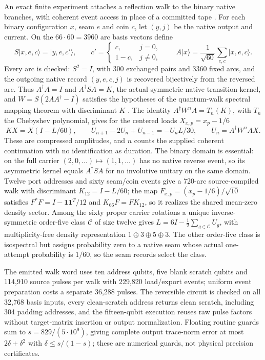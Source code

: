 \documentclass[11pt]{article}
\theoremstyle{definition}
\theoremstyle{remark}
\theoremstyle{plain}
\newcommand{\ket}[1]{\lvert #1\rangle}
\begin{document}
An exact finite experiment attaches a reflection walk to the binary native
branches, with coherent event access in place of a committed tape
\cite{oCOHERENT}. For each binary configuration $x$, seam $e$ and coin $c$,
let $(y,j)$ be the native output and current. On the $66\cdot60=3960$ arc
basis vectors define
\[
 S\ket{x,e,c}=\ket{y,e,c'},\qquad
 c'=\begin{cases}c,&j=0,\\1-c,&j\ne0,\end{cases}
 \qquad A\ket{x}=\frac1{\sqrt{60}}\sum_{e,c}\ket{x,e,c}.
\]
Every arc is checked: $S^2=I$, with 300 exchanged pairs and 3360 fixed arcs,
and the outgoing native record $(y,e,c,j)$ is recovered bijectively from the
reversed arc. Thus $A^\dagger A=I$ and $A^\dagger SA=K$, the actual symmetric
native transition kernel, and $W=S(2AA^\dagger-I)$ satisfies the hypotheses
of the quantum-walk spectral mapping theorem with discriminant $K$
\cite{pwhiguchi2016spectral,pwszegedy2004spectra}. The identity
$A^\dagger W^nA=T_n(K)$, with $T_n$ the Chebyshev polynomial, gives for the
centered loads $X_{x,p}=x_p-1/6$
\[
 KX=X(I-L/60),\qquad
 U_{n+1}-2U_n+U_{n-1}=-U_nL/30,
 \qquad U_n=A^\dagger W^nAX.
\]
These are compressed amplitudes, and $n$ counts the supplied coherent
continuation with no identification as duration. The binary domain is
essential: on the full carrier $(2,0,\ldots)\mapsto(1,1,\ldots)$ has no native
reverse event, so its asymmetric kernel equals $A^\dagger SA$ for no
involutive unitary on the same domain. Twelve port addresses and sixty
seam/coin events give a 720-arc source-compiled walk with discriminant
$K_{12}=I-L/60$; the map $F_{x,p}=(x_p-1/6)/\sqrt{10}$ satisfies
$F^*F=I-\mathbf1\mathbf1^T/12$ and $K_{66}F=FK_{12}$, so it realizes the
shared mean-zero density sector. Among the sixty proper carrier rotations a
unique inverse-symmetric order-five class $\mathcal C$ of size twelve gives
$L=6I-\frac12\sum_{g\in\mathcal C}U_g$, with multiplicity-free density
representation $1\oplus3\oplus5\oplus3$. The other order-five class is
isospectral but assigns probability zero to a native seam whose actual
one-attempt probability is $1/60$, so the seam records select the class.

The emitted walk word uses ten address qubits, five blank scratch qubits and
114,910 source pulses per walk with 229,820 load/export events; uniform event
preparation costs a separate 36,288 pulses. The reversible circuit is checked
on all 32,768 basis inputs, every clean-scratch address returns clean
scratch, including 304 padding addresses, and the fifteen-qubit execution
reuses raw pulse factors without target-matrix insertion or output
normalization. Floating routine guards sum to $s=829/(5\cdot10^9)$, giving
complete output trace-norm error at most $2\delta+\delta^2$ with
$\delta\le s/(1-s)$; these are numerical guards, not physical precision
certificates.
\end{document}
